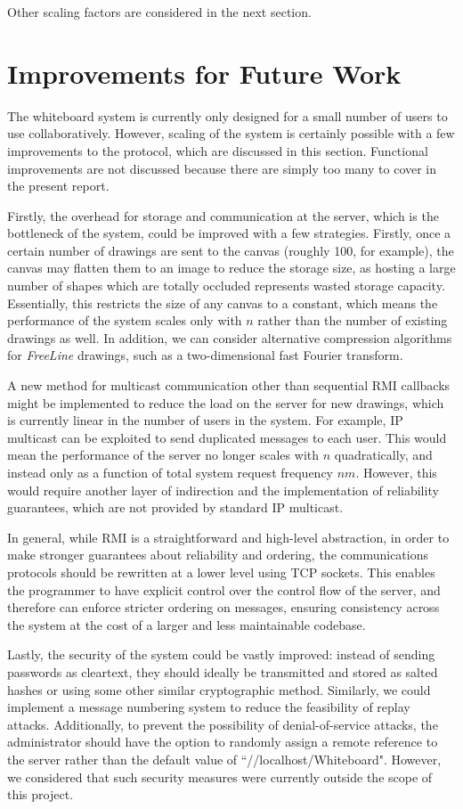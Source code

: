 \documentclass[12pt,a4paper]{article}
\begin{document}
Other scaling factors are considered in the next section.

\section{Improvements for Future Work}

The whiteboard system is currently only designed for a small number of users to use collaboratively. However, scaling of the system is certainly possible with a few improvements to the protocol, which are discussed in this section. Functional improvements are not discussed because there are simply too many to cover in the present report.

Firstly, the overhead for storage and communication at the server, which is the bottleneck of the system, could be improved with a few strategies. Firstly, once a certain number of drawings are sent to the canvas (roughly 100, for example), the canvas may flatten them to an image to reduce the storage size, as hosting a large number of shapes which are totally occluded represents wasted storage capacity. Essentially, this restricts the size of any canvas to a constant, which means the performance of the system scales only with $n$ rather than the number of existing drawings as well. In addition, we can consider alternative compression algorithms for \textit{FreeLine} drawings, such as a two-dimensional fast Fourier transform. 

A new method for multicast communication other than sequential RMI callbacks might be implemented to reduce the load on the server for new drawings, which is currently linear in the number of users in the system. For example, IP multicast can be exploited to send duplicated messages to each user. This would mean the performance of the server no longer scales with $n$ quadratically, and instead only as a function of total system request frequency $nm$. However, this would require another layer of indirection and the implementation of reliability guarantees, which are not provided by standard IP multicast. 

In general, while RMI is a straightforward and high-level abstraction, in order to make stronger guarantees about reliability and ordering, the communications protocols should be rewritten at a lower level using TCP sockets. This enables the programmer to have explicit control over the control flow of the server, and therefore can enforce stricter ordering on messages, ensuring consistency across the system at the cost of a larger and less maintainable codebase.

Lastly, the security of the system could be vastly improved: instead of sending passwords as cleartext, they should ideally be transmitted and stored as salted hashes or using some other similar cryptographic method. Similarly, we could implement a message numbering system to reduce the feasibility of replay attacks. Additionally, to prevent the possibility of denial-of-service attacks, the administrator should have the option to randomly assign a remote reference to the server rather than the default value of ``//localhost/Whiteboard". However, we considered that such security measures were currently outside the scope of this project.
\end{document}
